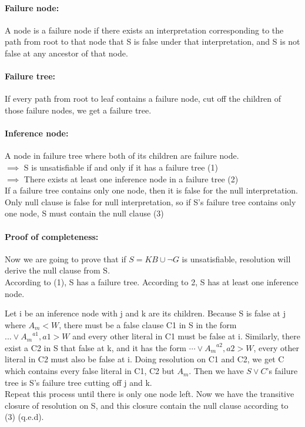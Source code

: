 \documentclass[26pt,fleqn,]{article}
\begin{document}
\paragraph{Failure node: } A node is a failure node if there exists an interpretation corresponding to
the path from root to that node that S is false under that interpretation, and S is not false at 
any ancestor of that node.\\
\paragraph{Failure tree: } If every path from root to leaf contains a failure node, cut off the children
of those failure nodes, we get a failure tree.\\
\paragraph{Inference node: } A node in failure tree where both of its children are failure node.\\
\(\implies\) S is unsatisfiable if and only if it has a failure tree (1)\\
\(\implies\) There exists at least one inference node in a failure tree (2)\\
If a failure tree contains only one node, then it is false for the null interpretation.
Only null clause is false for null interpretation, so if S's failure tree contains only one node, S
must contain the null clause (3)\\
%
\paragraph{Proof of completeness: } Now we are going to prove that if \(S = KB \cup \neg G\) is 
unsatisfiable, resolution will derive the null clause from S. \\
According to (1), S has a failure tree. According to 2, S has at least one inference node.\\


Let i be an inference node with j and k are its children. Because S is false at j where \(A_m < W\),
there must be a false clause C1 in S in the form \(...\vee {A_{m}}^{a1}, a1 > W\) and every other 
literal in C1 must be false at i. Similarly, there exist a C2 in S that false at k, and it has the form 
\(\cdots\vee {A_{m}}^{a2}, a2 > W\), every other literal in C2 must also be false at i.
Doing resolution on C1 and C2, we get C which contains every false literal in C1, C2 but \(A_{m}\).
Then we have \(S \vee C\)'s failure tree is S's failure tree cutting off j and k.\\
Repeat this process until there is only one node left. Now we have the transitive closure of resolution
on S, and this closure contain the null clause according to (3) (q.e.d).
%
\end{document}
